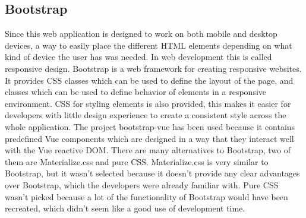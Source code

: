 \subsection{Bootstrap}
Since this web application is designed to work on both mobile and desktop devices, a way to easily place the different HTML elements depending on what kind of device the user has was needed. In web development this is called responsive design. Bootstrap is a web framework for creating responsive websites. It provides CSS classes which can be used to define the layout of the page, and classes which can be used to define behavior of elements in a responsive environment. CSS for styling elements is also provided, this makes it easier for developers with little design experience to create a consistent style across the whole application. The project bootstrap-vue has been used because it contains predefined Vue components which are designed in a way that they interact well with the Vue reactive DOM. There are many alternatives to Bootstrap, two of them are Materialize.css and pure CSS. Materialize.css is very similar to Bootstrap, but it wasn't selected because it doesn't provide any clear advantages over Bootstrap, which the developers were already familiar with. Pure CSS wasn't picked because a lot of the functionality of Bootstrap would have been recreated, which didn't seem like a good use of development time.